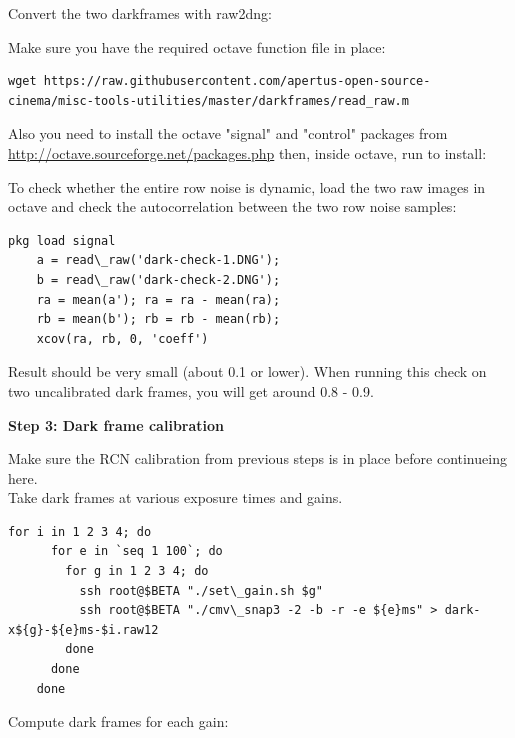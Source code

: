 {Convert the two darkframes with raw2dng: 


Make sure you have the required octave function file in place: 

\begin{lstlisting}[breaklines=true, breakatwhitespace=true]
    wget https://raw.githubusercontent.com/apertus-open-source-cinema/misc-tools-utilities/master/darkframes/read_raw.m
\end{lstlisting} 

Also you need to install the octave "signal" and "control" packages from \href{http://octave.sourceforge.net/packages.php}{http://octave.sourceforge.net/packages.php} then, inside octave, run to install:


To check whether the entire row noise is dynamic, load the two raw images in octave and check the autocorrelation between the two row noise samples: 

\begin{lstlisting}[breaklines=true, breakatwhitespace=true]
    pkg load signal
    a = read\_raw('dark-check-1.DNG');
    b = read\_raw('dark-check-2.DNG');
    ra = mean(a'); ra = ra - mean(ra);
    rb = mean(b'); rb = rb - mean(rb);
    xcov(ra, rb, 0, 'coeff')
\end{lstlisting} 

Result should be very small (about 0.1 or lower). When running this check on two uncalibrated dark frames, you will get around 0.8 - 0.9.

\textbf{Step 3: Dark frame calibration}

Make sure the RCN calibration from previous steps is in place before continueing here.\\

Take dark frames at various exposure times and gains.

\begin{lstlisting}[breaklines=true, breakatwhitespace=true]
    for i in 1 2 3 4; do
      for e in `seq 1 100`; do
        for g in 1 2 3 4; do
          ssh root@$BETA "./set\_gain.sh $g"
          ssh root@$BETA "./cmv\_snap3 -2 -b -r -e ${e}ms" > dark-x${g}-${e}ms-$i.raw12
        done
      done
    done
\end{lstlisting} 

Compute dark frames for each gain: 

    
}

